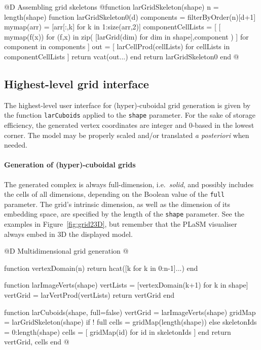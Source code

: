 @D Assembling grid skeletons
@{function larGridSkeleton(shape)
    n = length(shape)
    function larGridSkeleton0(d)
        components = filterByOrder(n)[d+1]
        mymap(arr) = [arr[:,k]  for k in 1:size(arr,2)]
        componentCellLists = [ [ mymap(f(x)) for (f,x) in zip( [larGrid(dim) 
        	for dim in shape],component ) ]
            	for component in components ]
        out = [ larCellProd(cellLists)  for cellLists in componentCellLists ]
        return vcat(out...)
    end
    return larGridSkeleton0
end
@}

\subsection{Highest-level grid interface}

The highest-level user interface for (hyper)-cuboidal grid generation is given by the function \texttt{larCuboids}  applied to the \texttt{shape} parameter.  
For the sake of storage efficiency, the generated vertex coordinates are integer and 0-based in the lowest corner. The model may be properly scaled and/or translated \emph{a posteriori} when needed.

\paragraph{Generation of (hyper)-cuboidal grids}

The generated complex is always full-dimension, i.e.~\emph{solid}, and possibly includes the cells of all dimensions, depending on the Boolean value of the \texttt{full} parameter.
The grid's intrinsic dimension, as well as the dimension of its embedding space, are specified by the length of the \texttt{shape} parameter. See the examples in Figure~\ref{fig:grid23D}, but remember that the PLaSM visualiser always embed in 3D the displayed model. 

@D Multidimensional grid generation
@{function vertexDomain(n)
	return hcat([k for k in 0:n-1]...)
end

function larImageVerts(shape)
	vertLists = [vertexDomain(k+1) for k in shape]
	vertGrid = larVertProd(vertLists)
	return vertGrid
end

function larCuboids(shape, full=false)
	vertGrid = larImageVerts(shape)
	gridMap = larGridSkeleton(shape)
	if ! full
		cells = gridMap(length(shape))
	else
		skeletonIds = 0:length(shape)
		cells = [ gridMap(id) for id in skeletonIds ]
	end
	return vertGrid, cells
end
@}




